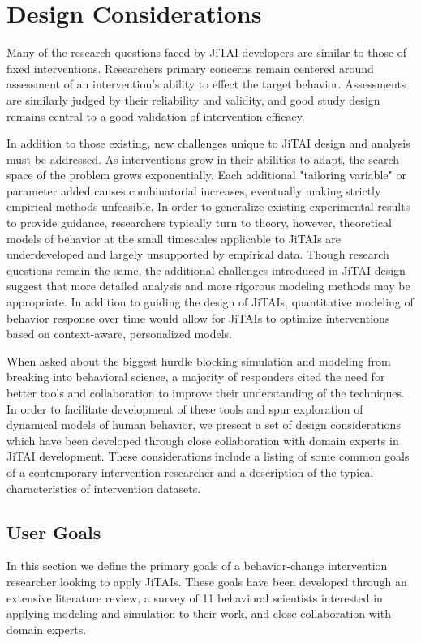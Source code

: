 \section{Design Considerations}
Many of the research questions faced by JiTAI developers are similar to those of fixed interventions. 
Researchers primary concerns remain centered around assessment of an intervention's ability to effect the target behavior.
Assessments are similarly judged by their reliability and validity, and good study design remains central to a good validation of intervention efficacy.

In addition to those existing, new challenges unique to JiTAI design and analysis must be addressed.
As interventions grow in their abilities to adapt, the search space of the problem grows exponentially.
Each additional "tailoring variable" or parameter added causes combinatorial increases, eventually making strictly empirical methods unfeasible.
In order to generalize existing experimental results to provide guidance, researchers typically turn to theory, however, theoretical models of behavior at the small timescales applicable to JiTAIs are underdeveloped and largely unsupported by empirical data. 
Though research questions remain the same, the additional challenges introduced in JiTAI design suggest that more detailed analysis and more rigorous modeling methods may be appropriate.
In addition to guiding the design of JiTAIs, quantitative modeling of behavior response over time would allow for JiTAIs to optimize interventions based on context-aware, personalized models.

When asked about the biggest hurdle blocking simulation and modeling from breaking into behavioral science, a majority of responders cited the need for better tools and collaboration to improve their understanding of the techniques.
In order to facilitate development of these tools and spur exploration of dynamical models of human behavior, we present a set of design considerations which have been developed through close collaboration with domain experts in JiTAI development.
These considerations include a listing of some common goals of a contemporary intervention researcher and a description of the typical characteristics of intervention datasets. 

\subsection{User Goals}
In this section we define the primary goals of a behavior-change intervention researcher looking to apply JiTAIs.
These goals have been developed through an extensive literature review, a survey of 11 behavioral scientists interested in applying modeling and simulation to their work, and close collaboration with domain experts.

